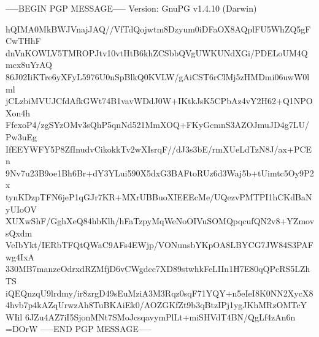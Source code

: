 -----BEGIN PGP MESSAGE-----
Version: GnuPG v1.4.10 (Darwin)

hQIMA0MkBWJVnajJAQ//VfTdQojwtm8Dzyum0iDFaOX8AQplFU5WhZQ5gFCwTHhF
dnVnKOWLV5TMROPJtv10vtHtB6khZCSbbQVgUWKUNdXGi/PDELoUM4Qmcx8uYrAQ
86J02IiKTre6yXFyL5976U0nSpBlkQ0KVLW/gAiCST6rClMj5zHMDmi06uwW0lml
jCLzbiMVUJCfdAfkGWt74B1vavWDdJ0W+IKtkJsK5CPbAz4vY2H62+Q1NPOXon4h
FfexoP4/zgSYzOMv3sQhP5qnNd521MmXOQ+FKyGcmnS3AZOJmuJD4g7LU/Pw3uEg
IfEEYWFY5P8ZfInudvCikokkTv2wXIsrqF//dJ3s3bE/rmXUeLdTzN8J/ax+PCEn
9Nv7u23B9oe1Bh6Br+dY3YLui590X5dxG3BAFtoRUz6d3Waj5b+tUimtc5Oy9P2x
tynKDzpTFN6jeP1qGJr7KR+MXrUBBuoXIEEEcMe/UQezvPMTPI1hCKdBaNyUIoOV
XUXwShF/GghXeQ84hbKlh/hFaTzpyMqWeNoOIVuSOMQpqcufQN2v8+YZmovsQxdm
VeIbYkt/IERbTFQtQWaC9AFs4EWjp/VONunsbYKpOA8LBYCG7JW84S3PAFwg4IxA
330MB7manzeOdrxdRZMfjD6vCWgdcc7XD89stwhkFeLIIn1H7E80qQPcRS5LZhTS
iQEQnzqU9lrdmy/ir8zrgD49sEuMziA3M3Rqz0sqF71YQY+n5eIeI8K0NN2XycX8
4hvb7p4kAZqUrwzAh8TuBKAiEk0/AOZGKfZt9b3qBtzIPj1ygJKhMRzOMTcYWIil
6JZu4AZ7iI5SjonMNt7SMoJcsqavymPlLt+miSHVdT4BN/QgLf4zAn6n
=DOrW
-----END PGP MESSAGE-----
